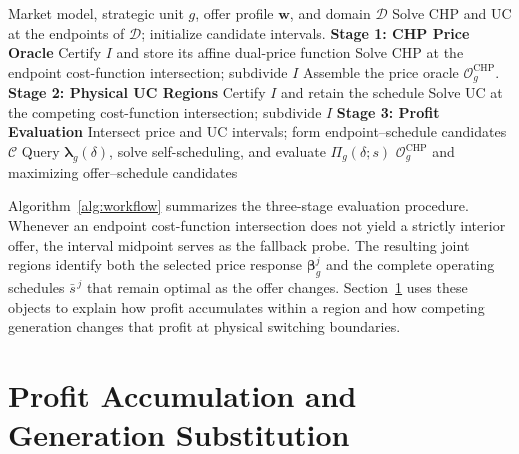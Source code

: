 \documentclass[journal]{IEEEtran}
\newcommand{\blambda}{\bm\lambda}
\newcommand{\CHP}{\mathrm{CHP}}
\begin{document}
\begin{algorithm}[t]
\caption{Parametric CHP Oracle and Profit Evaluation}
\label{alg:workflow}
\begin{algorithmic}[1]
\Require Market model, strategic unit $g$, offer profile $\bm{w}$, and domain $\mathcal{D}$
\State Solve CHP and UC at the endpoints of $\mathcal{D}$; initialize candidate intervals.
\Statex \textbf{Stage 1: CHP Price Oracle}
  \State Certify $I$ and store its affine dual-price function 
 \Else
  \State Solve CHP at the endpoint cost-function intersection; subdivide $I$
 \EndIf
\EndWhile
\State Assemble the price oracle $\mathcal{O}_g^{\CHP}$.
\Statex \textbf{Stage 2: Physical UC Regions}
  \State Certify $I$ and retain the schedule 
 \Else
  \State Solve UC at the competing cost-function intersection; subdivide $I$
 \EndIf
\EndWhile
\Statex \textbf{Stage 3: Profit Evaluation}
\State Intersect price and UC intervals; form endpoint--schedule candidates $\mathcal{C}$
 \State Query $\blambda_g(\delta)$, solve self-scheduling, and evaluate $\Pi_g(\delta;s)$
\EndFor
\State \Return $\mathcal{O}_g^{\CHP}$ and maximizing offer--schedule candidates
\end{algorithmic}
\end{algorithm}

Algorithm~\ref{alg:workflow} summarizes the three-stage evaluation procedure. Whenever an endpoint cost-function intersection does not yield a strictly interior offer, the interval midpoint serves as the fallback probe. The resulting joint regions identify both the selected price response $\bm{\beta}_g^j$ and the complete operating schedules $\bar{s}^{\,j}$ that remain optimal as the offer changes. Section~\ref{sec:mechanism} uses these objects to explain how profit accumulates within a region and how competing generation changes that profit at physical switching boundaries.

\section{Profit Accumulation and Generation Substitution}
\label{sec:mechanism}
\end{document}

